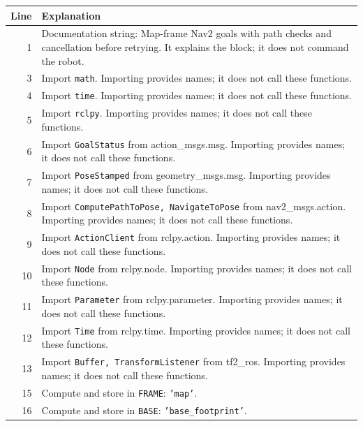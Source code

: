 \documentclass[11pt,a4paper]{book}
\begin{document}
\begin{longtable}{r p{}}

\textbf{Line} & \textbf{Explanation} \\ \hline \endhead

1 & Documentation string: Map-frame Nav2 goals with path checks and cancellation before retrying. It explains the block; it does not command the robot. \\

3 & Import \texttt{math}. Importing provides names; it does not call these functions. \\

4 & Import \texttt{time}. Importing provides names; it does not call these functions. \\

5 & Import \texttt{rclpy}. Importing provides names; it does not call these functions. \\

6 & Import \texttt{GoalStatus} from action\_msgs.msg. Importing provides names; it does not call these functions. \\

7 & Import \texttt{PoseStamped} from geometry\_msgs.msg. Importing provides names; it does not call these functions. \\

8 & Import \texttt{ComputePathToPose, NavigateToPose} from nav2\_msgs.action. Importing provides names; it does not call these functions. \\

9 & Import \texttt{ActionClient} from rclpy.action. Importing provides names; it does not call these functions. \\

10 & Import \texttt{Node} from rclpy.node. Importing provides names; it does not call these functions. \\

11 & Import \texttt{Parameter} from rclpy.parameter. Importing provides names; it does not call these functions. \\

12 & Import \texttt{Time} from rclpy.time. Importing provides names; it does not call these functions. \\

13 & Import \texttt{Buffer, TransformListener} from tf2\_ros. Importing provides names; it does not call these functions. \\

15 & Compute and store in \texttt{FRAME}: \texttt{'map'}.  \\

16 & Compute and store in \texttt{BASE}: \texttt{'base\_footprint'}.  \\

\end{longtable}
\end{document}
